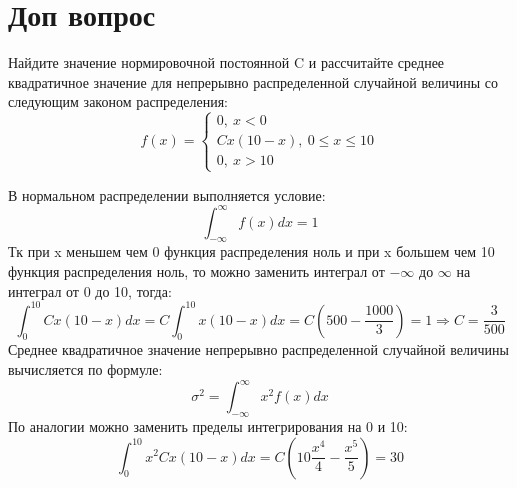 \documentclass[a4paper]{article}
\begin{document}
\section{\textbf{Доп вопрос}}
Найдите значение нормировочной постоянной C и рассчитайте среднее квадратичное значение для непрерывно распределенной случайной величины со следующим законом распределения:
\begin{equation*}
	f(x) =
	\begin{cases}
		0,\: x<0\\
		Cx(10-x),\: 0\leq x\leq 10\\
		0,\: x>10
	\end{cases}
\end{equation*}

В нормальном распределении выполняется условие:
\begin{equation*}
\int_{-\infty}^{\infty} f(x)dx = 1
\end{equation*}
Тк при x меньшем чем 0 функция распределения ноль и при x большем чем 10 функция распределения ноль, то можно заменить интеграл от $-\infty$ до $\infty$ на интеграл от 0 до 10, тогда:
\begin{equation*}
	\int_{0}^{10} Cx(10-x)dx = C \int_{0}^{10} x(10-x)dx = C(500-\dfrac{1000}{3})=1 \Rightarrow C=\dfrac{3}{500}
\end{equation*}
Среднее квадратичное значение непрерывно распределенной случайной величины вычисляется по формуле:
\begin{equation*}
	\sigma^2 = \int_{-\infty}^{\infty} x^2f(x)dx
\end{equation*}
По аналогии можно заменить пределы интегрирования на 0 и 10:
\begin{equation*}
	\int_{0}^{10} x^2 Cx(10-x)dx =C(10\dfrac{x^4}{4}-\dfrac{x^5}{5})=30
\end{equation*}
\end{document}
